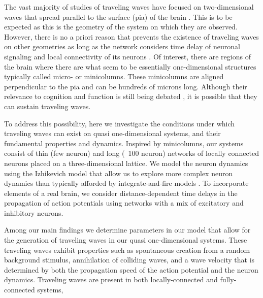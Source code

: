\documentclass[a4paper,11pt]{article}
\begin{document}
The vast majority of studies of traveling waves have focused on two-dimensional waves that spread parallel to the surface (pia) of the brain \cite{reimer2010}\cite{keane2015}. 
This is to be expected as this is the geometry of the system on which they are observed. 
However, there is no a priori reason that prevents the existence of traveling waves on other geometries as long as the network considers time delay of neuronal signaling and local connectivity of its neurons \cite{ermentrout2001}\cite{senk2020}. 
Of interest, there are regions of the brain where there are what seem to be essentially one-dimensional structures \cite{buxhoeveden2002}\cite{mountcastle1997}\cite{rockland2004} typically called micro- or minicolumns. 
These minicolumns are aligned perpendicular to the pia and can be hundreds of microns long.  
Although their relevance to cognition and function is still being debated \cite{horton2005}\cite{cruz2009}\cite{daCosta2010}\cite{buxhoeveden2002}, it is possible that they can sustain traveling waves.

To address this possibility, here we investigate the conditions under which traveling waves can exist on quasi one-dimensional systems, and their fundamental properties and dynamics.  
Inspired by minicolumns, our systems consist of thin (few neuron) and long (~100 neuron) networks of locally connected neurons placed on a three-dimensional lattice.  
We model the neuron dynamics using the Izhikevich model \cite{izhikevich2003} that allow us to explore more complex neuron dynamics than typically afforded by integrate-and-fire models \cite{keane2015}\cite{senk2020}. 
To incorporate elements of a real brain, we consider distance-dependent time delays in the propagation of action potentials using networks with a mix of excitatory and inhibitory neurons.

Among our main findings we determine parameters in our model that allow for the generation of traveling waves in our quasi one-dimensional systems. 
These traveling waves exhibit properties such as spontaneous creation from a random background stimulus, annihilation of colliding waves, and a wave velocity that is determined by both the propagation speed of the action potential and the neuron dynamics.
Traveling waves are present in both locally-connected and fully-connected systems, 
\end{document}
